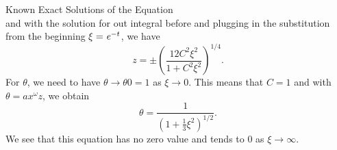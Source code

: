 \begin{subsection}{Known Exact Solutions of the \texorpdfstring{}{LE} Equation}
\begin{equation}
\end{equation}
and with the solution for out integral before and plugging in the substitution from the beginning $\xi=\mathit{e}^{-t}$, we have
\begin{equation}
	z=\pm\left(\frac{12C^2\xi^2}{1+C^2\xi^2}\right)^{1/4}.
	\label{eq:99-App-LE-N5-Intermediate-Eq3}
\end{equation}
For $\theta$, we need to have $\theta\rightarrow\theta0=1$ as $\xi\rightarrow0$.
This means that $C=1$ and with $\theta=ax^\omega z$, we obtain
\begin{equation}
	\theta = \frac{1}{\left(1+\frac{1}{3}\xi^2\right)^{1/2}}.
	\label{eq:99-App-LE-N5-LE-Result}
\end{equation}
We see that this equation has no zero value and tends to $0$ as $\xi\rightarrow\infty$.
\end{subsection}
%
%
%

